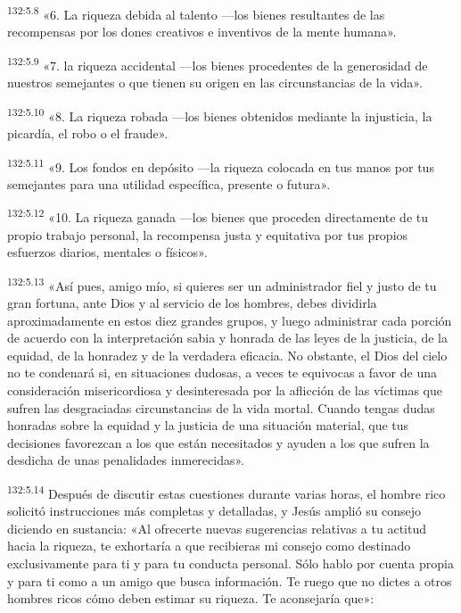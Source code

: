 \par 
\textsuperscript{132:5.8} «6. La riqueza debida al talento ---los bienes resultantes de las recompensas por los dones creativos e inventivos de la mente humana».

\par 
\textsuperscript{132:5.9} «7. la riqueza accidental ---los bienes procedentes de la generosidad de nuestros semejantes o que tienen su origen en las circunstancias de la vida».

\par 
\textsuperscript{132:5.10} «8. La riqueza robada ---los bienes obtenidos mediante la injusticia, la picardía, el robo o el fraude».

\par 
\textsuperscript{132:5.11} «9. Los fondos en depósito ---la riqueza colocada en tus manos por tus semejantes para una utilidad específica, presente o futura».

\par 
\textsuperscript{132:5.12} «10. La riqueza ganada ---los bienes que proceden directamente de tu propio trabajo personal, la recompensa justa y equitativa por tus propios esfuerzos diarios, mentales o físicos».

\par 
\textsuperscript{132:5.13} «Así pues, amigo mío, si quieres ser un administrador fiel y justo de tu gran fortuna, ante Dios y al servicio de los hombres, debes dividirla aproximadamente en estos diez grandes grupos, y luego administrar cada porción de acuerdo con la interpretación sabia y honrada de las leyes de la justicia, de la equidad, de la honradez y de la verdadera eficacia. No obstante, el Dios del cielo no te condenará si, en situaciones dudosas, a veces te equivocas a favor de una consideración misericordiosa y desinteresada por la aflicción de las víctimas que sufren las desgraciadas circunstancias de la vida mortal. Cuando tengas dudas honradas sobre la equidad y la justicia de una situación material, que tus decisiones favorezcan a los que están necesitados y ayuden a los que sufren la desdicha de unas penalidades inmerecidas».

\par 
\textsuperscript{132:5.14} Después de discutir estas cuestiones durante varias horas, el hombre rico solicitó instrucciones más completas y detalladas, y Jesús amplió su consejo diciendo en sustancia: «Al ofrecerte nuevas sugerencias relativas a tu actitud hacia la riqueza, te exhortaría a que recibieras mi consejo como destinado exclusivamente para ti y para tu conducta personal. Sólo hablo por cuenta propia y para ti como a un amigo que busca información. Te ruego que no dictes a otros hombres ricos cómo deben estimar su riqueza. Te aconsejaría que»:

